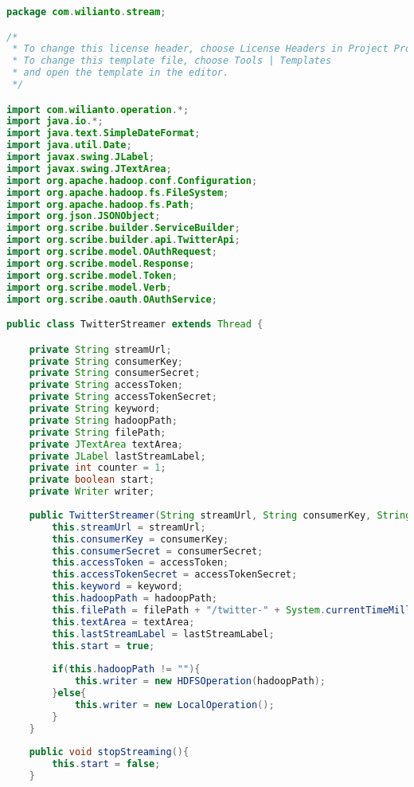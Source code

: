 \begin{lstlisting}[language=Java,basicstyle=\tiny,caption=TwitterStreamer.java]
package com.wilianto.stream;

/*
 * To change this license header, choose License Headers in Project Properties.
 * To change this template file, choose Tools | Templates
 * and open the template in the editor.
 */

import com.wilianto.operation.*;
import java.io.*;
import java.text.SimpleDateFormat;
import java.util.Date;
import javax.swing.JLabel;
import javax.swing.JTextArea;
import org.apache.hadoop.conf.Configuration;
import org.apache.hadoop.fs.FileSystem;
import org.apache.hadoop.fs.Path;
import org.json.JSONObject;
import org.scribe.builder.ServiceBuilder;
import org.scribe.builder.api.TwitterApi;
import org.scribe.model.OAuthRequest;
import org.scribe.model.Response;
import org.scribe.model.Token;
import org.scribe.model.Verb;
import org.scribe.oauth.OAuthService;

public class TwitterStreamer extends Thread {

    private String streamUrl;
    private String consumerKey;
    private String consumerSecret;
    private String accessToken;
    private String accessTokenSecret;
    private String keyword;
    private String hadoopPath;
    private String filePath;
    private JTextArea textArea;
    private JLabel lastStreamLabel;
    private int counter = 1;
    private boolean start;
    private Writer writer;
    
    public TwitterStreamer(String streamUrl, String consumerKey, String consumerSecret, String accessToken, String accessTokenSecret, String keyword, String hadoopPath, String filePath, JTextArea textArea, JLabel lastStreamLabel) {
        this.streamUrl = streamUrl;
        this.consumerKey = consumerKey;
        this.consumerSecret = consumerSecret;
        this.accessToken = accessToken;
        this.accessTokenSecret = accessTokenSecret;
        this.keyword = keyword;
        this.hadoopPath = hadoopPath;
        this.filePath = filePath + "/twitter-" + System.currentTimeMillis() + ".txt";
        this.textArea = textArea;
        this.lastStreamLabel = lastStreamLabel;
        this.start = true;
        
        if(this.hadoopPath != ""){
            this.writer = new HDFSOperation(hadoopPath);
        }else{
            this.writer = new LocalOperation();
        }
    }
    
    public void stopStreaming(){
        this.start = false;
    }
    

\end{lstlisting}
